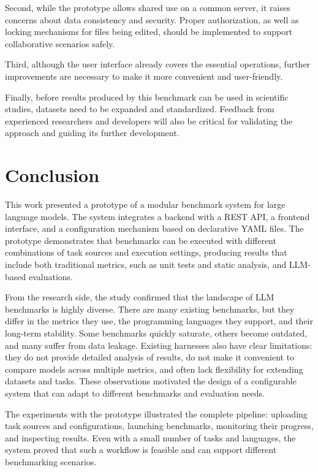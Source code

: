 Second, while the prototype allows shared use on a common server, it raises concerns about data consistency and security.
Proper authorization, as well as locking mechanisms for files being edited, should be implemented to support collaborative scenarios safely.

Third, although the user interface already covers the essential operations, further improvements are necessary to make it more convenient and user-friendly.

Finally, before results produced by this benchmark can be used in scientific studies, datasets need to be expanded and standardized.
Feedback from experienced researchers and developers will also be critical for validating the approach and guiding its further development.


\chapter{Conclusion}

This work presented a prototype of a modular benchmark system for large language models. The system integrates a backend with a REST API, a frontend interface, and a configuration mechanism based on declarative YAML files. The prototype demonstrates that benchmarks can be executed with different combinations of task sources and execution settings, producing results that include both traditional metrics, such as unit tests and static analysis, and LLM-based evaluations.

From the research side, the study confirmed that the landscape of LLM benchmarks is highly diverse. There are many existing benchmarks, but they differ in the metrics they use, the programming languages they support, and their long-term stability. Some benchmarks quickly saturate, others become outdated, and many suffer from data leakage. Existing harnesses also have clear limitations: they do not provide detailed analysis of results, do not make it convenient to compare models across multiple metrics, and often lack flexibility for extending datasets and tasks. These observations motivated the design of a configurable system that can adapt to different benchmarks and evaluation needs.

The experiments with the prototype illustrated the complete pipeline: uploading task sources and configurations, launching benchmarks, monitoring their progress, and inspecting results. Even with a small number of tasks and languages, the system proved that such a workflow is feasible and can support different benchmarking scenarios.

